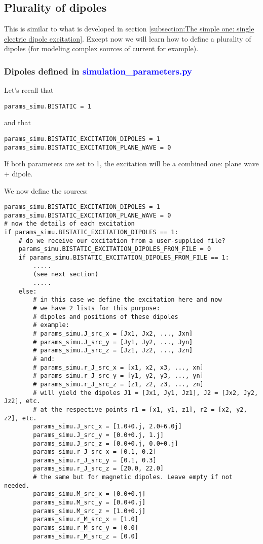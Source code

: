 \documentclass[a4paper,10pt]{book}
\newcommand{\file}[1] {\textcolor{blue}{\textsf{#1}}}
\begin{document}
\subsection{Plurality of dipoles}
%
\par
This is similar to what is developed in section \ref{subsection:The simple one: single electric dipole excitation}. Except now we will learn how to define a plurality of dipoles (for modeling complex sources of current for example).

\subsubsection{Dipoles defined in \file{simulation\_parameters.py}}
%
\par
Let's recall that
\begin{verbatim}
params_simu.BISTATIC = 1
\end{verbatim}
and that
\begin{verbatim}
params_simu.BISTATIC_EXCITATION_DIPOLES = 1
params_simu.BISTATIC_EXCITATION_PLANE_WAVE = 0
\end{verbatim}
If both parameters are set to 1, the excitation will be a combined one: plane wave + dipole.
%
\par
We now define the sources:
\begin{verbatim}
params_simu.BISTATIC_EXCITATION_DIPOLES = 1
params_simu.BISTATIC_EXCITATION_PLANE_WAVE = 0
# now the details of each excitation
if params_simu.BISTATIC_EXCITATION_DIPOLES == 1:
    # do we receive our excitation from a user-supplied file?
    params_simu.BISTATIC_EXCITATION_DIPOLES_FROM_FILE = 0
    if params_simu.BISTATIC_EXCITATION_DIPOLES_FROM_FILE == 1:
        .....
        (see next section)
        .....
    else:
        # in this case we define the excitation here and now
        # we have 2 lists for this purpose: 
        # dipoles and positions of these dipoles
        # example:
        # params_simu.J_src_x = [Jx1, Jx2, ..., Jxn]
        # params_simu.J_src_y = [Jy1, Jy2, ..., Jyn]
        # params_simu.J_src_z = [Jz1, Jz2, ..., Jzn]
        # and:
        # params_simu.r_J_src_x = [x1, x2, x3, ..., xn]
        # params_simu.r_J_src_y = [y1, y2, y3, ..., yn]
        # params_simu.r_J_src_z = [z1, z2, z3, ..., zn]
        # will yield the dipoles J1 = [Jx1, Jy1, Jz1], J2 = [Jx2, Jy2, Jz2], etc.
        # at the respective points r1 = [x1, y1, z1], r2 = [x2, y2, z2], etc.
        params_simu.J_src_x = [1.0+0.j, 2.0+6.0j]
        params_simu.J_src_y = [0.0+0.j, 1.j]
        params_simu.J_src_z = [0.0+0.j, 0.0+0.j]
        params_simu.r_J_src_x = [0.1, 0.2]
        params_simu.r_J_src_y = [0.1, 0.3]
        params_simu.r_J_src_z = [20.0, 22.0]
        # the same but for magnetic dipoles. Leave empty if not needed.
        params_simu.M_src_x = [0.0+0.j]
        params_simu.M_src_y = [0.0+0.j]
        params_simu.M_src_z = [1.0+0.j]
        params_simu.r_M_src_x = [1.0]
        params_simu.r_M_src_y = [0.0]
        params_simu.r_M_src_z = [0.0]
\end{verbatim}
\end{document}
